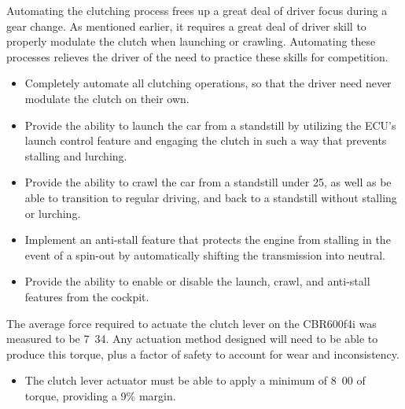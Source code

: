 Automating the clutching process frees up a great deal of driver focus during a gear change. As mentioned earlier, it requires a great deal of driver skill to properly modulate the clutch when launching or crawling. Automating these processes relieves the driver of the need to practice these skills for competition.

\begin{itemize}
\item Completely automate all clutching operations, so that the driver need never modulate the clutch on their own.
\item Provide the ability to launch the car from a standstill by utilizing the ECU's launch control feature and engaging the clutch in such a way that prevents stalling and lurching.
\item Provide the ability to crawl the car from a standstill under \unit{25}{\kilo\metre\per\hour}, as well as be able to transition to regular driving, and back to a standstill without stalling or lurching.
\item Implement an anti-stall feature that protects the engine from stalling in the event of a spin-out by automatically shifting the transmission into neutral.
\item Provide the ability to enable or disable the launch, crawl, and anti-stall features from the cockpit.
\end{itemize}
  
The average force required to actuate the clutch lever on the CBR600f4i was measured to be \unit{7.34}{\newton\metre}. Any actuation method designed will need to be able to produce this torque, plus a factor of safety to account for wear and inconsistency.

\begin{itemize}
\item The clutch lever actuator must be able to apply a minimum of \unit{8.00}{\newton\metre} of torque, providing a 9\% margin.
\end{itemize}  

